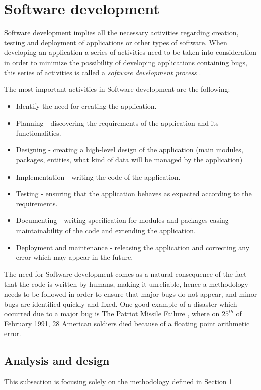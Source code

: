 \section{Software development}\label{softDev}
Software development \cite{ibmSoftDev} implies all the necessary activities regarding  creation, testing and deployment of applications or other types of software. When developing an application a series of activities need to be taken into consideration in order to minimize the possibility of developing applications containing bugs, this series of activities is called a \emph{software development process} \cite{thePragmaticProgrammer}. 
\par The most important activities in Software development are the following:
\begin{itemize}
    \item Identify the need for creating the application.
    \item Planning - discovering the requirements of the application and its functionalities.
    \item Designing - creating a high-level design of the application (main modules, packages, entities, what kind of data will be managed by the application)
    \item Implementation - writing the code of the application.
    \item Testing - ensuring that the application behaves as expected according to the requirements.
    \item Documenting - writing specification for modules and packages easing maintainability of the code and extending the application.
    \item Deployment and maintenance - releasing the application and correcting any error which may appear in the future.
\end{itemize}

\par The need for Software development comes as a natural consequence of the fact that the code is written by humans, making it unreliable, hence a methodology needs to be followed in order to ensure that major bugs do not appear, and minor bugs are identified quickly and fixed. One good example of a disaster which occurred due to a major bug is The Patriot Missile Failure \cite{badBugs}, where on $25^{th}$ of February 1991, 28 American soldiers died because of a floating point arithmetic error.

\subsection{Analysis and design}\label{ad}
This subsection is focusing solely on the methodology defined in Section \ref{softDev}
